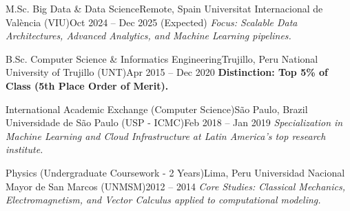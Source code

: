 
\resumeSubheading
  {M.Sc. Big Data \& Data Science}{Remote, Spain}
  {Universitat Internacional de València (VIU)}{Oct 2024 -- Dec 2025 (Expected)}
  {\textit{Focus: Scalable Data Architectures, Advanced Analytics, and Machine Learning pipelines.}}

\resumeSubheading
  {B.Sc. Computer Science \& Informatics Engineering}{Trujillo, Peru}
  {National University of Trujillo (UNT)}{Apr 2015 -- Dec 2020}
  {\textbf{Distinction: Top 5\% of Class (5th Place Order of Merit).}}

\resumeSubheading
  {International Academic Exchange (Computer Science)}{São Paulo, Brazil}
  {Universidade de São Paulo (USP - ICMC)}{Feb 2018 -- Jan 2019}
  {\textit{Specialization in Machine Learning and Cloud Infrastructure at Latin America's top research institute.}}

\resumeSubheading
  {Physics (Undergraduate Coursework - 2 Years)}{Lima, Peru}
  {Universidad Nacional Mayor de San Marcos (UNMSM)}{2012 -- 2014}
  {\textit{Core Studies: Classical Mechanics, Electromagnetism, and Vector Calculus applied to computational modeling.}}